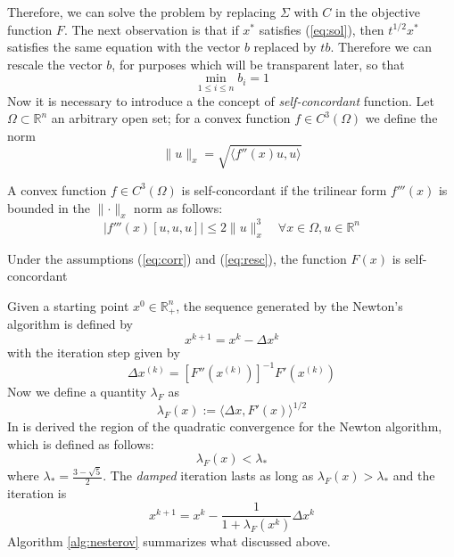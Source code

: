 Therefore, we can solve the problem by replacing $\Sigma$ with $C$ in the objective function $F$. The next observation is that if $x^*$ satisfies (\ref{eq:sol}), then $t^{1/2}x^*$ satisfies the same equation with the vector $b$ replaced by $tb$. Therefore we can rescale the vector $b$, for purposes which will be transparent later, so that
\begin{equation}\label{eq:resc}
\min_{1 \leq i \leq n} b_i = 1
\end{equation}
Now it is necessary to introduce a the concept of \textit{self-concordant} function. Let $\Omega \subset \mathbb{R}^n$ an arbitrary open set; for a convex function $f \in C^3(\Omega)$ we define the norm 
\begin{equation}
\parallel u \parallel _x = \sqrt{\langle f''(x)u,u\rangle}
\end{equation}
\begin{definition}
A convex function $f \in C^3(\Omega)$ is self-concordant if the trilinear form $f'''(x)$ is bounded in the $\parallel \cdot \parallel _x$ norm as follows:
\begin{equation}
|f'''(x)[u,u,u]| \leq 2\parallel u \parallel_x^3 \quad \forall x \in \Omega, u \in \mathbb{R}^n
\end{equation}
\end{definition}
\begin{lemma}
Under the assumptions  (\ref{eq:corr}) and (\ref{eq:resc}), the function $F(x)$ is self-concordant
\end{lemma}
Given a starting point $x^{0} \in \mathbb{R}^n_+$, the sequence generated by the Newton's algorithm is defined by
\begin{equation}
x^{k+1} = x^{k} - \Delta x^{k}
\end{equation}
with the iteration step given by
\begin{equation}
\Delta x^{(k)} = [F''(x^{(k)})]^{-1}F'(x^{(k)})
\end{equation}
Now we define a quantity $\lambda_F$ as
\begin{equation}
\lambda_F(x) := \langle \Delta x, F'(x)\rangle^{1/2}
\end{equation}
In \cite{nesterov} is derived the region of the quadratic convergence for the Newton algorithm, which is defined as follows:
\begin{equation}
\lambda_F(x) < \lambda_*
\end{equation} 
where $\lambda_* = \frac{3-\sqrt{5}}{2}$. The \textit{damped} iteration lasts as long as $\lambda_F(x) > \lambda_*$ and the iteration is
\begin{equation}
x^{k+1} = x^{k} - \frac{1}{1+\lambda_F(x^{k})}\Delta x^{k}
\end{equation}
Algorithm \ref{alg:nesterov} summarizes what discussed above.

